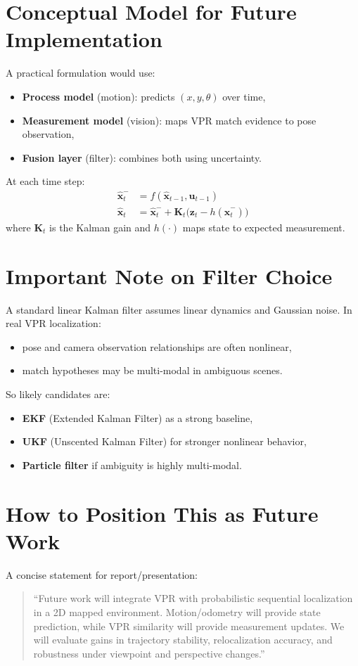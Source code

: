 \documentclass[11pt]{article}
\begin{document}
\section*{Conceptual Model for Future Implementation}
A practical formulation would use:
\begin{itemize}[leftmargin=*]
  \item \textbf{Process model} (motion): predicts $(x,y,\theta)$ over time,
  \item \textbf{Measurement model} (vision): maps VPR match evidence to pose observation,
  \item \textbf{Fusion layer} (filter): combines both using uncertainty.
\end{itemize}

At each time step:
\begin{align*}
\hat{\mathbf{x}}_{t}^{-} &= f(\hat{\mathbf{x}}_{t-1}, \mathbf{u}_{t-1}) \\
\hat{\mathbf{x}}_{t} &= \hat{\mathbf{x}}_{t}^{-} + \mathbf{K}_t\big(\mathbf{z}_t - h(\hat{\mathbf{x}}_{t}^{-})\big)
\end{align*}
where $\mathbf{K}_t$ is the Kalman gain and $h(\cdot)$ maps state to expected measurement.

\section*{Important Note on Filter Choice}
A standard linear Kalman filter assumes linear dynamics and Gaussian noise. In real VPR localization:
\begin{itemize}[leftmargin=*]
  \item pose and camera observation relationships are often nonlinear,
  \item match hypotheses may be multi-modal in ambiguous scenes.
\end{itemize}

So likely candidates are:
\begin{itemize}[leftmargin=*]
  \item \textbf{EKF} (Extended Kalman Filter) as a strong baseline,
  \item \textbf{UKF} (Unscented Kalman Filter) for stronger nonlinear behavior,
  \item \textbf{Particle filter} if ambiguity is highly multi-modal.
\end{itemize}

\section*{How to Position This as Future Work}
A concise statement for report/presentation:
\begin{quote}
``Future work will integrate VPR with probabilistic sequential localization in a 2D mapped environment. Motion/odometry will provide state prediction, while VPR similarity will provide measurement updates. We will evaluate gains in trajectory stability, relocalization accuracy, and robustness under viewpoint and perspective changes.''
\end{quote}
\end{document}
